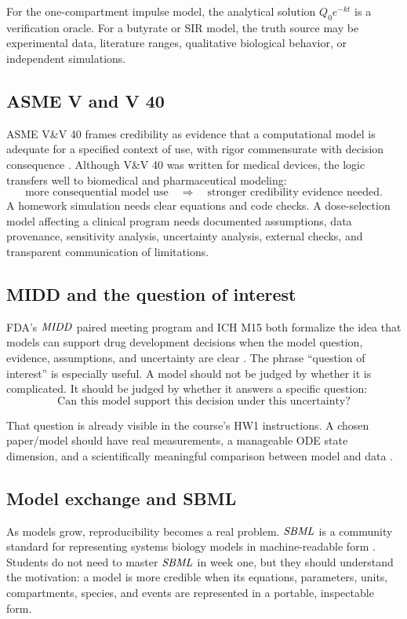 \documentclass[a4paper]{article}
\newcommand{\MIDD}{\ensuremath{\pksym{MIDD}}}
\newcommand{\SBML}{\ensuremath{\pksym{SBML}}}
\begin{document}
For the one-compartment impulse model, the analytical solution \(Q_0e^{-kt}\) is a verification oracle. For a butyrate or SIR model, the truth source may be experimental data, literature ranges, qualitative biological behavior, or independent simulations.

\subsection{ASME V and V 40}

ASME V\&V 40 frames credibility as evidence that a computational model is adequate for a specified context of use, with rigor commensurate with decision consequence \cite{asmeVV402018}. Although V\&V 40 was written for medical devices, the logic transfers well to biomedical and pharmaceutical modeling:
\[
  \text{more consequential model use}
  \quad\Rightarrow\quad
  \text{stronger credibility evidence needed}.
\]
A homework simulation needs clear equations and code checks. A dose-selection model affecting a clinical program needs documented assumptions, data provenance, sensitivity analysis, uncertainty analysis, external checks, and transparent communication of limitations.

\subsection{MIDD and the question of interest}

FDA's \MIDD{} paired meeting program and ICH M15 both formalize the idea that models can support drug development decisions when the model question, evidence, assumptions, and uncertainty are clear \cite{fdaMiddProgram2026,ichM15Midd2026}. The phrase ``question of interest'' is especially useful. A model should not be judged by whether it is complicated. It should be judged by whether it answers a specific question:
\[
  \text{Can this model support this decision under this uncertainty?}
\]

That question is already visible in the course's HW1 instructions. A chosen paper/model should have real measurements, a manageable ODE state dimension, and a scientifically meaningful comparison between model and data \cite{bmeg671Lecture2Slides2025,bmeg671TranscriptSep032025}.

\subsection{Model exchange and SBML}

As models grow, reproducibility becomes a real problem. \SBML{} is a community standard for representing systems biology models in machine-readable form \cite{sbmlLevel3Version2Release2}. Students do not need to master \SBML{} in week one, but they should understand the motivation: a model is more credible when its equations, parameters, units, compartments, species, and events are represented in a portable, inspectable form.
\end{document}
